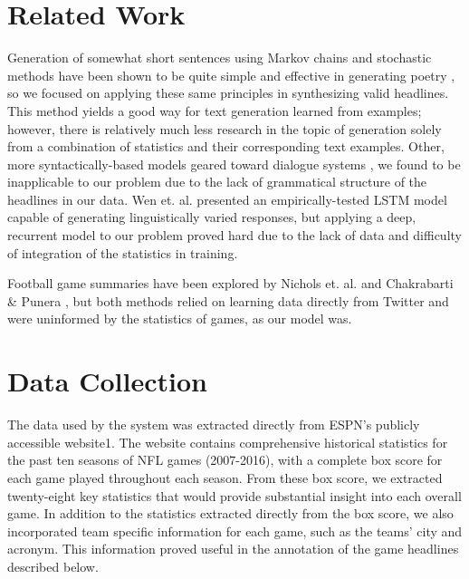 \documentclass[12pt, journal]{IEEEtran}
\begin{document}

%
%
\section{Related Work}
Generation of somewhat short sentences using Markov chains and stochastic methods have
been shown to be quite simple and effective in generating poetry \cite{1}\cite{2}, so we focused on applying these same principles in synthesizing valid headlines. This method yields a good way for text generation learned from examples; however, there is relatively much less research in the topic of generation solely from a combination of statistics and their corresponding text examples. Other, more syntactically-based models geared toward dialogue systems \cite{3}\cite{4}, we found to be inapplicable to our problem due to the lack of grammatical structure of the headlines in our data. Wen et. al. \cite{5} presented an empirically-tested LSTM model capable of generating linguistically varied responses, but applying a deep, recurrent model to our problem proved hard due to the lack of data and difficulty of integration of the statistics in training.

Football game summaries have been explored by Nichols et. al. \cite{6} and Chakrabarti \& Punera \cite{7}, but both methods relied on learning data directly from Twitter and were uninformed by the statistics of games, as our model was. 

\section{Data Collection}

The data used by the system was extracted directly from ESPN's publicly accessible website1. The website contains comprehensive historical statistics for the past ten seasons of NFL games (2007-2016), with a complete box score for each game played throughout each season. From these box score, we extracted twenty-eight key statistics that would provide substantial insight into each overall game. In addition to the statistics extracted directly from the box score, we also incorporated team specific information for each game, such as the teams' city and acronym. This information proved useful in the annotation of the game headlines described below.
\end{document}
